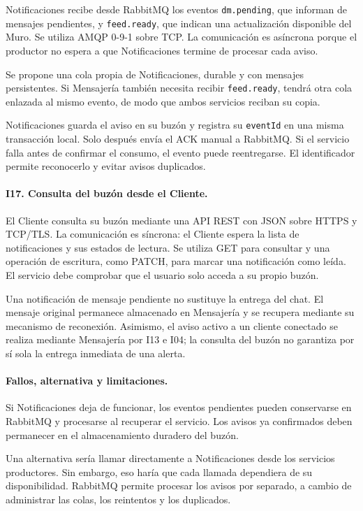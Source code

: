 \documentclass[12pt,a4paper]{article}
\begin{document}
Notificaciones recibe desde RabbitMQ los eventos
\texttt{dm.pending}, que informan de mensajes pendientes,
y \texttt{feed.ready}, que indican una actualización
disponible del Muro. Se utiliza AMQP 0-9-1 sobre TCP.
La comunicación es asíncrona porque el productor no espera
a que Notificaciones termine de procesar cada aviso.

Se propone una cola propia de Notificaciones, durable
y con mensajes persistentes. Si Mensajería también necesita
recibir \texttt{feed.ready}, tendrá otra cola enlazada
al mismo evento, de modo que ambos servicios reciban
su copia.

Notificaciones guarda el aviso en su buzón y registra
su \texttt{eventId} en una misma transacción local.
Solo después envía el ACK manual a RabbitMQ.
Si el servicio falla antes de confirmar el consumo,
el evento puede reentregarse. El identificador permite
reconocerlo y evitar avisos duplicados.

\paragraph{I17. Consulta del buzón desde el Cliente.}

El Cliente consulta su buzón mediante una API REST con
JSON sobre HTTPS y TCP/TLS. La comunicación es síncrona:
el Cliente espera la lista de notificaciones y sus estados
de lectura. Se utiliza GET para consultar y una operación
de escritura, como PATCH, para marcar una notificación
como leída. El servicio debe comprobar que el usuario
solo acceda a su propio buzón.

Una notificación de mensaje pendiente no sustituye
la entrega del chat. El mensaje original permanece
almacenado en Mensajería y se recupera mediante su
mecanismo de reconexión. Asimismo, el aviso activo
a un cliente conectado se realiza mediante Mensajería
por I13 e I04; la consulta del buzón no garantiza
por sí sola la entrega inmediata de una alerta.

\paragraph{Fallos, alternativa y limitaciones.}

Si Notificaciones deja de funcionar, los eventos pendientes
pueden conservarse en RabbitMQ y procesarse al recuperar
el servicio. Los avisos ya confirmados deben permanecer
en el almacenamiento duradero del buzón.

Una alternativa sería llamar directamente a Notificaciones
desde los servicios productores. Sin embargo, eso haría
que cada llamada dependiera de su disponibilidad.
RabbitMQ permite procesar los avisos por separado,
a cambio de administrar las colas, los reintentos
y los duplicados.
\end{document}

